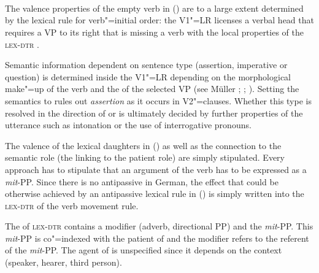\begin{exe}
\begin{xlist}[iv.]
\begin{exe}
\begin{xlist}[iv.]
{{{{{                                      }\\
                          }\\
}\\
}}
\z
%
The valence properties of the empty verb in () are to a large extent determined by the lexical rule for verb"=initial order: the V1"=LR licenses a verbal head
that requires a VP to its right that is missing a verb with the local properties of the \textsc{lex-dtr} .

Semantic information dependent on sentence type (assertion, imperative or question) is determined inside the V1"=LR depending on the morphological
make"=up of the verb and the \slashv of the selected VP (see Müller
\citeyear[Section~10.3]{MuellerLehrbuch1}; \citeyear{MuellerSatztypen}; \citeyear{MuellerGS}).
Setting the semantics to   rules out \emph{assertion} as it occurs in V2"=clauses.
Whether this type is resolved in the direction of  or
 is ultimately decided by further properties of the utterance such as intonation or the use of interrogative pronouns.

The valence of the lexical daughters in () as well as the connection to the semantic role (the linking to the patient role) are simply stipulated.
Every approach has to stipulate that an argument of the verb has to be expressed as a \emph{mit}-PP. Since there is no antipassive in German,
the effect that could be otherwise achieved by an antipassive lexical rule in () is simply written into the \textsc{lex-dtr} of the verb movement rule.

The \subcatl of \textsc{lex-dtr} contains a modifier (adverb, directional PP) and the 
\emph{mit}-PP. This \emph{mit}-PP is co"=indexed with the patient of  and the modifier refers to the referent of the \emph{mit}-PP. The agent
of  is unspecified since it depends on the context (speaker, hearer, third person).


\end{xlist}
\end{exe}
\end{xlist}
\end{exe}
